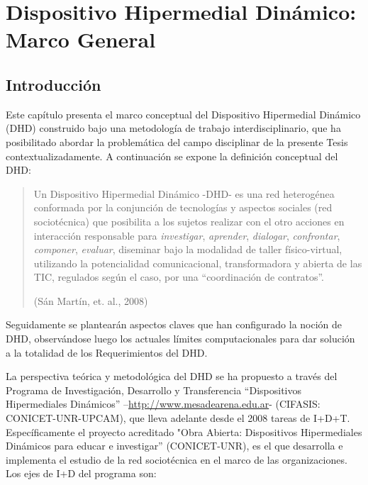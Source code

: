 ﻿%

\chapter{Dispositivo Hipermedial Dinámico: Marco General}\label{cap:dhd} \label{cap:2}

\section{Introducción}

Este capítulo presenta el marco conceptual del Dispositivo Hipermedial Dinámico
(DHD) construido bajo una metodología de trabajo interdisciplinario, que ha
posibilitado abordar la problemática del campo disciplinar de la presente Tesis
contextualizadamente. A continuación se expone la definición conceptual del DHD:

\begin{quote} \label{definiciondhd}

Un Dispositivo Hipermedial Dinámico -DHD- es una red
heterogénea conformada por la conjunción de tecnologías y aspectos sociales (red sociotécnica) que
posibilita a los sujetos realizar con el otro acciones en interacción
responsable para \textit{investigar}, \textit{aprender}, \textit{dialogar},
\textit{confrontar}, \textit{componer}, \textit{evaluar}, diseminar bajo la
modalidad de taller físico-virtual, utilizando la potencialidad comunicacional,
transformadora y abierta de las TIC, regulados según el caso, por una
“coordinación de contratos”.

\begin{flushright}
(Sán Martín, et. al., 2008)\end{flushright}
\end{quote} 

Seguidamente se plantearán aspectos claves que han configurado la noción de DHD, observándose luego los actuales límites computacionales para dar solución a la totalidad de los Requerimientos del DHD.

La perspectiva teórica y metodológica del DHD se ha propuesto a través del Programa de Investigación, Desarrollo y Transferencia
“Dispositivos Hipermediales Dinámicos” –\url{http://www.mesadearena.edu.ar}-
(CIFASIS: CONICET-UNR-UPCAM), que lleva adelante desde el 2008 tareas de I+D+T. Específicamente el proyecto acreditado "Obra Abierta: Dispositivos Hipermediales Dinámicos para educar e
investigar” (CONICET-UNR), es el que desarrolla e implementa el estudio de la red sociotécnica en el marco de las organizaciones. Los ejes de I+D del programa son:

